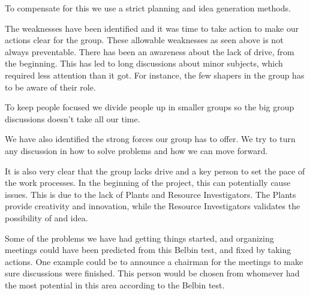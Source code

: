 To compensate for this we use a strict planning and idea generation methods.

The weaknesses have been identified and it was time to take action to make our actions clear for the group. 
These allowable weaknesses as seen above is not always preventable. 
There has been an awareness about the lack of drive, from the beginning. 
This has led to long discussions about minor subjects, which required less attention than it got. 
For instance, the few shapers in the group has to be aware of their role. 

To keep people focused we divide people up in smaller groups so the big group discussions doesn't take all our time.

We have also identified the strong forces our group has to offer.
We try to turn any discussion in how to solve problems and how we can move forward. 

It is also very clear that the group lacks drive and a key person to set the pace of the work processes. In the beginning of the project, this can potentially cause issues. This is due to the lack of Plants and Resource Investigators. The Plants provide creativity and innovation, while the Resource Investigators validates the possibility of and idea.

Some of the problems we have had getting things started, and organizing meetings could have been predicted from this Belbin test, and fixed by taking actions. One example could be to announce a chairman for the meetings to make sure discussions were finished. This person would be chosen from whomever had the most potential in this area according to the Belbin test.


 


